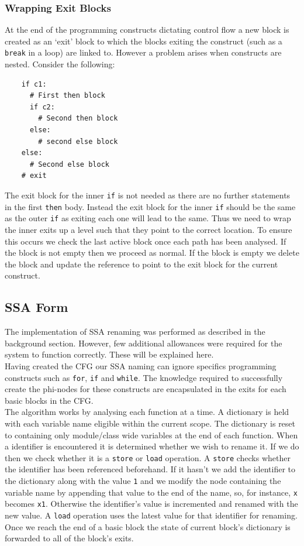 \documentclass[12pt, titlepage]{article}
\begin{document}
\subsubsection{Wrapping Exit Blocks}
At the end of the programming constructs dictating control flow a new block is created as an `exit' block to which the blocks exiting the construct (such as a \texttt{break} in a loop) are linked to. However a problem arises when constructs are nested. Consider the following:
\begin{lstlisting}
    if c1:
      # First then block
      if c2:
        # Second then block
      else:
        # second else block
    else:
      # Second else block
    # exit
\end{lstlisting}
The exit block for the inner \texttt{if} is not needed as there are no further statements in the first \texttt{then} body. Instead the exit block for the inner \texttt{if} should be the same as the outer \texttt{if} as exiting each one will lead to the same. Thus we need to wrap the inner exits up a level such that they point to the correct location. To ensure this occurs we check the last active block once each path has been analysed. If the block is not empty then we proceed as normal. If the block is empty we delete the block and update the reference to point to the exit block for the current construct.

\subsection{SSA Form}
The implementation of SSA renaming was performed as described in the background section. However, few additional allowances were required for the system to function correctly. These will be explained here. \\
\indent Having created the CFG our SSA naming can ignore specifics programming constructs such as \texttt{for}, \texttt{if} and \texttt{while}. The knowledge required to successfully create the phi-nodes  for these constructs are encapsulated in the exits for each basic blocks in the CFG. \\
\indent The algorithm works by analysing each function at a time. A dictionary is held with each variable name eligible within the current scope. The dictionary is reset to containing only module/class wide variables at the end of each function. When a identifier is encountered it is determined whether we wish to rename it. If we do then we check whether it is a \texttt{store} or \texttt{load} operation. A \texttt{store} checks whether the identifier has been referenced beforehand. If it hasn't we add the identifier to the dictionary along with the value \texttt{1} and we modify the node containing the variable name by appending that value to the end of the name, so, for instance, \texttt{x} becomes \texttt{x1}. Otherwise the identifier's value is incremented and renamed with the new value. A \texttt{load} operation uses the latest value for that identifier for renaming. Once we reach the end of a basic block the state of current block's dictionary is forwarded to all of the block's exits.
\end{document}
